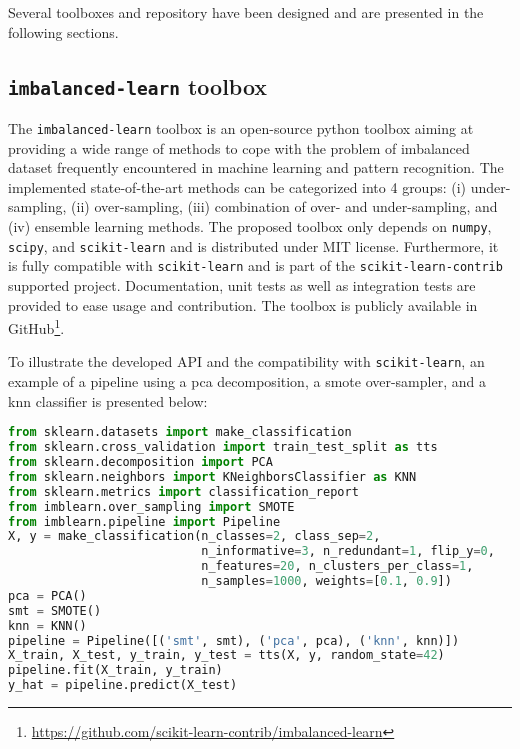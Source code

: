 Several toolboxes and repository have been designed and are presented in the following sections.

\subsection{\texttt{imbalanced-learn} toolbox}

The \texttt{imbalanced-learn} toolbox is an open-source python toolbox aiming at providing a wide range of methods to cope with the problem of imbalanced dataset frequently encountered in machine learning and pattern recognition.
The implemented state-of-the-art methods can be categorized into 4 groups: (i) under-sampling, (ii) over-sampling, (iii) combination of over- and under-sampling, and (iv) ensemble learning methods.
The proposed toolbox only depends on \texttt{numpy}, \texttt{scipy}, and \texttt{scikit-learn} and is distributed under MIT license.
Furthermore, it is fully compatible with \texttt{scikit-learn} and is part of the \texttt{scikit-learn-contrib} supported project.
Documentation, unit tests as well as integration tests are provided to ease usage and contribution.
The toolbox is publicly available in GitHub\footnote{\url{https://github.com/scikit-learn-contrib/imbalanced-learn}}.

To illustrate the developed API and the compatibility with \texttt{scikit-learn}, an example of a pipeline using a \ac{pca} decomposition, a \ac{smote} over-sampler, and a \ac{knn} classifier is presented below:

\begin{lstlisting}[language=Python, caption=Code snippet to over-sample a dataset using \acs*{smote} in conjunction with \ac{pca} and a \ac{knn} classifer.]
from sklearn.datasets import make_classification
from sklearn.cross_validation import train_test_split as tts
from sklearn.decomposition import PCA
from sklearn.neighbors import KNeighborsClassifier as KNN
from sklearn.metrics import classification_report
from imblearn.over_sampling import SMOTE
from imblearn.pipeline import Pipeline
X, y = make_classification(n_classes=2, class_sep=2,
                           n_informative=3, n_redundant=1, flip_y=0,
                           n_features=20, n_clusters_per_class=1,
                           n_samples=1000, weights=[0.1, 0.9])
pca = PCA()
smt = SMOTE()
knn = KNN()
pipeline = Pipeline([('smt', smt), ('pca', pca), ('knn', knn)])
X_train, X_test, y_train, y_test = tts(X, y, random_state=42)
pipeline.fit(X_train, y_train)
y_hat = pipeline.predict(X_test)
\end{lstlisting}


